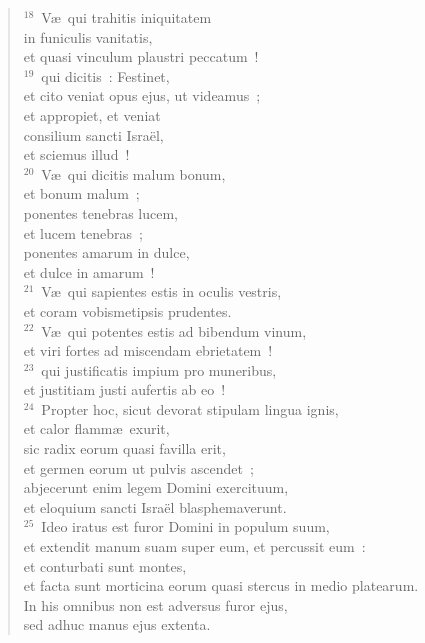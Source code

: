 \begin{flushleft}\begin{verse}${}^{18}$~V\ae\ qui trahitis iniquitatem\\ in funiculis vanitatis,\\ et quasi vinculum plaustri peccatum~!\\
${}^{19}$~qui dicitis~: Festinet,\\ et cito veniat opus ejus, ut videamus~;\\ et appropiet, et veniat\\ consilium sancti Isra\"el,\\ et sciemus illud~!\\
${}^{20}$~V\ae\ qui dicitis malum bonum,\\ et bonum malum~;\\ ponentes tenebras lucem,\\ et lucem tenebras~;\\ ponentes amarum in dulce,\\ et dulce in amarum~!\\
${}^{21}$~V\ae\ qui sapientes estis in oculis vestris,\\ et coram vobismetipsis prudentes.\\
${}^{22}$~V\ae\ qui potentes estis ad bibendum vinum,\\ et viri fortes ad miscendam ebrietatem~!\\
${}^{23}$~qui justificatis impium pro muneribus,\\ et justitiam justi aufertis ab eo~!\\
${}^{24}$~Propter hoc, sicut devorat stipulam lingua ignis,\\ et calor flamm\ae\ exurit,\\ sic radix eorum quasi favilla erit,\\ et germen eorum ut pulvis ascendet~;\\ abjecerunt enim legem Domini exercituum,\\ et eloquium sancti Isra\"el blasphemaverunt.\\
${}^{25}$~Ideo iratus est furor Domini in populum suum,\\ et extendit manum suam super eum, et percussit eum~:\\ et conturbati sunt montes,\\ et facta sunt morticina eorum quasi stercus in medio platearum.\\ In his omnibus non est adversus furor ejus,\\ sed adhuc manus ejus extenta.\\

\end{verse}
\end{flushleft}
